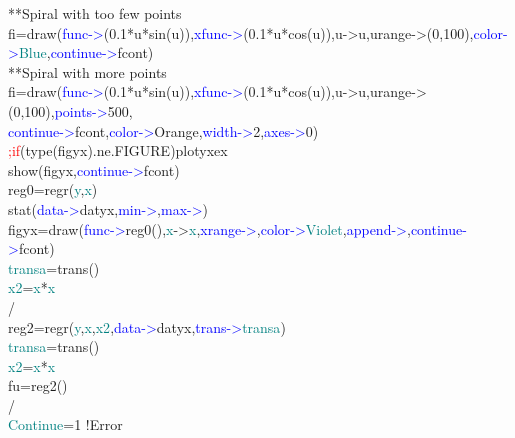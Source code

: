 \begin{example}[drawex]
{\color{ForestGreen}**Spiral with too few points}\\ 
fi=\textcolor{VioletRed}{draw}(\textcolor{blue}{func->}(0.1*u*\textcolor{VioletRed}{sin}(u)),\textcolor{blue}{xfunc->}(0.1*u*\textcolor{VioletRed}{cos}(u)),u->u,urange->(0,100),\textcolor{blue}{color->}\textcolor{teal}{Blue},\textcolor{blue}{continue->}fcont)\\ 
{\color{ForestGreen}**Spiral with more points}\\ 
fi=\textcolor{VioletRed}{draw}(\textcolor{blue}{func->}(0.1*u*\textcolor{VioletRed}{sin}(u)),\textcolor{blue}{xfunc->}(0.1*u*\textcolor{VioletRed}{cos}(u)),u->u,urange->(0,100),\textcolor{blue}{points->}500,\\ 
\textcolor{blue}{continue->}fcont,\textcolor{blue}{color->}Orange,\textcolor{blue}{width->}2,\textcolor{blue}{axes->}0)\\ 
\textcolor{Red}{;if}(\textcolor{VioletRed}{type}(figyx).ne.FIGURE)plotyxex\\ 
\textcolor{VioletRed}{show}(figyx,\textcolor{blue}{continue->}fcont)\\ 
reg0=\textcolor{VioletRed}{regr}(\textcolor{teal}{y},\textcolor{teal}{x})\\ 
\textcolor{VioletRed}{stat}(\textcolor{blue}{data->}datyx,\textcolor{blue}{min->},\textcolor{blue}{max->})\\ 
figyx=\textcolor{VioletRed}{draw}(\textcolor{blue}{func->}reg0(),\textcolor{teal}{x}->\textcolor{teal}{x},\textcolor{blue}{xrange->},\textcolor{blue}{color->}\textcolor{teal}{Violet},\textcolor{blue}{append->},\textcolor{blue}{continue->}fcont)\\ 
\textcolor{teal}{transa}=\textcolor{VioletRed}{trans}()\\ 
\textcolor{teal}{x2}=\textcolor{teal}{x}*\textcolor{teal}{x}\\ 
/                                                           \\ 
reg2=\textcolor{VioletRed}{regr}(\textcolor{teal}{y},\textcolor{teal}{x},\textcolor{teal}{x2},\textcolor{blue}{data->}datyx,\textcolor{blue}{trans->}\textcolor{teal}{transa})\\ 
\textcolor{teal}{transa}=\textcolor{VioletRed}{trans}()\\ 
\textcolor{teal}{x2}=\textcolor{teal}{x}*\textcolor{teal}{x}\\ 
fu=reg2()\\ 
/        \\ 
\textcolor{teal}{Continue}=1\,\,{\color{ForestGreen}!Error}\\ 

\end{example}
